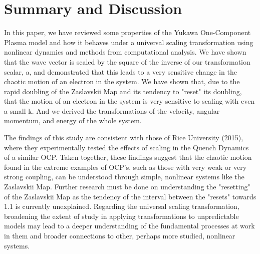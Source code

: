 \documentclass{article}
\begin{document}
\section{Summary and Discussion}
In this paper, we have reviewed some properties of the Yukawa One-Component Plasma model and how it behaves under a universal scaling transformation using nonlinear dynamics and methods from computational analysis. We have shown that the wave vector is scaled by the square of the inverse of our transformation scalar, a, and demonstrated that this leads to a very sensitive change in the chaotic motion of an electron in the system. We have shown that, due to the rapid doubling of the Zaslavskii Map and its tendency to "reset" its doubling, that the motion of an electron in the system is very sensitive to scaling with even a small k. And we derived the transformations of the velocity, angular momentum, and energy of the whole system.

The findings of this study are consistent with those of Rice University (2015)\cite{ocp1}, where they experimentally tested the effects of scaling in the Quench Dynamics of a similar OCP. Taken together, these findings suggest that the chaotic motion found in the extreme examples of OCP's, such as those with very weak or very strong coupling, can be understood through simple, nonlinear systems like the Zaslavskii Map. Further research must be done on understanding the "resetting" of the Zaslavskii Map as the tendency  of the interval between the "resets" towards 1.1 is currently unexplained. Regarding the universal scaling transformation, broadening the extent of study in applying transformations to unpredictable models may lead to a deeper understanding of the fundamental processes at work in them and broader connections to other, perhaps more studied, nonlinear systems.
\end{document}
